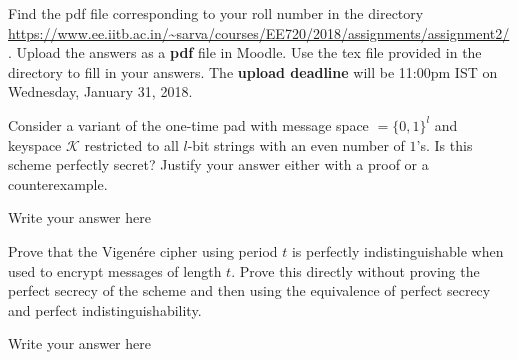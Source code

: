 \documentclass[12pt,a4paper,answers]{exam}
\begin{document}
\pagestyle{head}
\headrule
{}
%

\extraheadheight{.4in}%
\extrafootheight{-0.5in}%
\extrawidth{0.5in}%

Find the pdf file corresponding to your roll number in the directory \url{https://www.ee.iitb.ac.in/~sarva/courses/EE720/2018/assignments/assignment2/}. Upload the answers as a \textbf{pdf} file in Moodle. Use the tex file provided in the directory to fill in your answers. The \textbf{upload deadline} will be 11:00pm IST on Wednesday, January 31, 2018.
\begin{questions}
\question[5] Consider a variant of the one-time pad with message space $\mathcal = \{0,1\}^l$ and keyspace $\mathcal{K}$ restricted to all $l$-bit strings with an even number of $1$'s. Is this scheme perfectly secret? Justify your answer either with a proof or a counterexample.
  \begin{solution}
    Write your answer here
  \end{solution}

  \question[5] Prove that the Vigen\'ere cipher using period $t$ is perfectly indistinguishable when used to encrypt messages of length $t$. Prove this directly without proving the perfect secrecy of the scheme and then using the equivalence of perfect secrecy and perfect indistinguishability.
  \begin{solution}
    Write your answer here
  \end{solution}

  
\end{questions}
\end{document}
